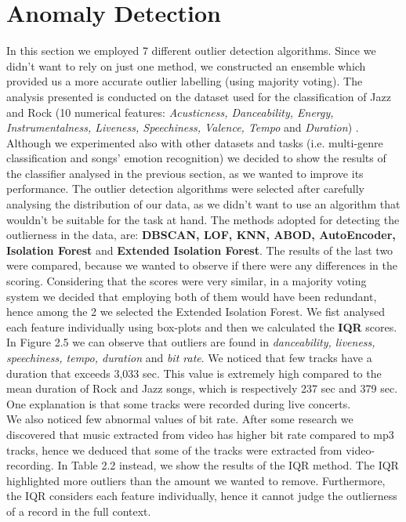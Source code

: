 \section{Anomaly Detection}
In this section we employed 7 different outlier detection algorithms. Since we didn't want to rely on just one method, we constructed an ensemble which provided us a more accurate outlier labelling (using majority voting). 
The analysis presented is conducted on the dataset used for the classification of Jazz and Rock (10 numerical features: \textit{Acusticness, Danceability, Energy, Instrumentalness, Liveness, Speechiness, Valence, Tempo} and \textit{Duration}) . Although we experimented also with other datasets and tasks (i.e. multi-genre classification and songs' emotion recognition) we decided to show the results of the classifier analysed in the previous section, as we wanted to improve its performance.
The outlier detection algorithms were selected after carefully analysing the distribution of our data, as we didn't want to use an algorithm that wouldn't be suitable for the task at hand.
The methods adopted for detecting the outlierness in the data, are: \textbf{DBSCAN, LOF, KNN, ABOD, AutoEncoder, Isolation Forest} and \textbf{Extended Isolation Forest}. 
The results of the last two were compared, because we wanted to observe if there were any differences in the scoring. Considering that the scores were very similar, in a majority voting system we decided that employing both of them would have been redundant, hence among the 2 we selected the Extended Isolation Forest.
We fist analysed each feature individually using box-plots and then we calculated the \textbf{IQR} scores.\\In Figure 2.5 we can observe that outliers are found in \textit{danceability, liveness, speechiness, tempo, duration} and \textit{bit rate}. 
We noticed that few tracks have a duration that exceeds 3,033 sec. This value is extremely high compared to the mean duration of Rock and Jazz songs, which is respectively 237 sec and 379 sec. One explanation is that some tracks were recorded during live concerts. \\We also noticed few abnormal values of bit rate. After some research we discovered that music extracted from video has higher bit rate compared to mp3 tracks, hence we deduced that some of the tracks were extracted from video-recording. In Table 2.2 instead, we show the results of the IQR method. The IQR highlighted more outliers than the amount we wanted to remove. Furthermore, the IQR considers each feature individually, hence it cannot judge the outlierness of a record in the full context.

